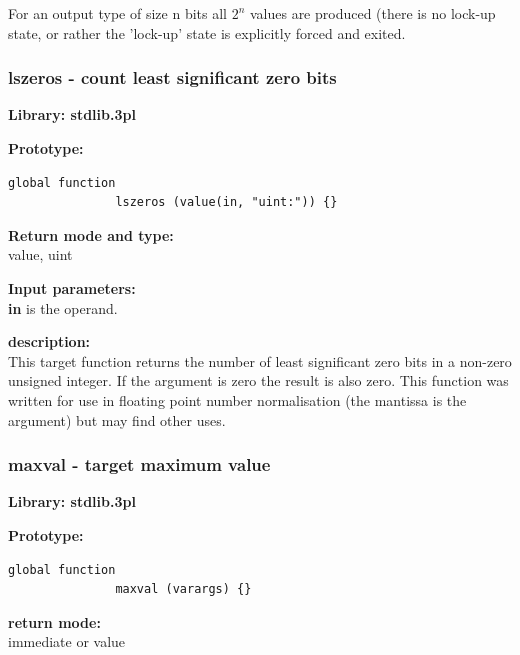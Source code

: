             For an output type of size n bits all $2^n$ values are produced (there
            is no lock-up state, or rather the 'lock-up' state is explicitly forced
            and exited.



        \subsubsection{lszeros - count least significant zero bits}\label{sec:lflszeros}

            {\bf Library: stdlib.3pl}

            {\bf Prototype:} \\
            \vsp
            \begin{lstlisting}[gobble=12, language=threepl]
               global function
               lszeros (value(in, "uint:")) {}
            \end{lstlisting}

            {\bf Return mode and type:} \\
            value, uint

            {\bf Input parameters:} \\            
            {\bf in} is the operand.

            {\bf description:} \\
            This target function returns the number of least significant zero
            bits in a non-zero unsigned integer. If the argument is zero the
            result is also zero. This function was written for use in floating
            point number normalisation (the mantissa is the argument) but may
            find other uses.




        \subsubsection{maxval - target maximum value}\label{sec:lfmaxval}

            {\bf Library: stdlib.3pl}

            {\bf Prototype:} \\
            \vsp
            \begin{lstlisting}[gobble=12, language=threepl]
               global function
               maxval (varargs) {}
            \end{lstlisting}

            {\bf return mode:} \\
            immediate or value

